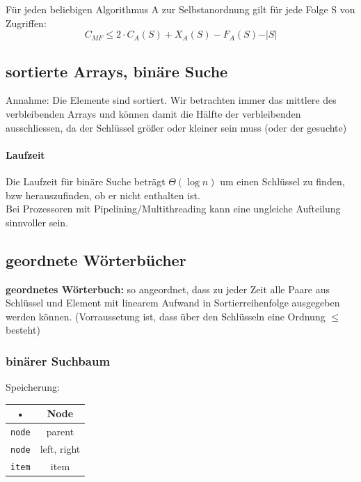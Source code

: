 \documentclass{scrartcl}
\begin{document}
\begin{shaded}
Für jeden beliebigen Algorithmus A zur Selbstanordnung gilt für jede Folge S von Zugriffen:
\[ C_{MF} \leq 2\cdot C_A(S)+X_A(S)-F_A(S)-\vert S\vert \]
\end{shaded}

\subsection{sortierte Arrays, binäre Suche}
Annahme: Die Elemente sind sortiert. Wir betrachten immer das mittlere des verbleibenden Arrays und können damit die Hälfte der verbleibenden ausschliessen, da der Schlüssel größer oder kleiner sein muss (oder der gesuchte)
\paragraph{Laufzeit}
Die Laufzeit für binäre Suche beträgt $\Theta(\log n)$ um einen Schlüssel zu finden, bzw herauszufinden, ob er nicht enthalten ist.\\
Bei Prozessoren mit Pipelining/Multithreading kann eine ungleiche Aufteilung sinnvoller sein.

\subsection{geordnete Wörterbücher}
\begin{shaded}
\textbf{geordnetes Wörterbuch:} so angeordnet, dass zu jeder Zeit alle Paare aus Schlüssel und Element mit linearem Aufwand in Sortierreihenfolge ausgegeben werden können. {\tiny (Vorraussetung ist, dass über den Schlüsseln eine Ordnung $\leq$ besteht)}
\end{shaded}
\subsubsection{binärer Suchbaum}
Speicherung:\begin{tabular}{|c|c|}
\hline • & Node \\
\hline \hline \texttt{node} & parent \\
\hline \texttt{node} & left, right \\
\hline \texttt{item} & item \\
\hline
\end{tabular}
\end{document}

